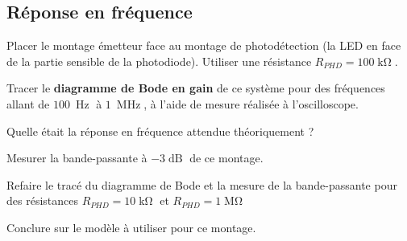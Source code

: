 \subsection{Réponse en fréquence}

\Manip Placer le montage émetteur face au montage de photodétection (la LED en face de la partie sensible de la photodiode). Utiliser une résistance $R_{PHD} = 100\operatorname{k\Omega}$.

\Manip Tracer le \textbf{diagramme de Bode en gain} de ce système pour des fréquences allant de $100~\operatorname{Hz}$ à $1~\operatorname{MHz}$, à l'aide de mesure réalisée à l'oscilloscope.

\Quest Quelle était la réponse en fréquence attendue théoriquement ? 

\Manip Mesurer la bande-passante à $-3\operatorname{dB}$ de ce montage.

\medskip

\Manip Refaire le tracé du diagramme de Bode et la mesure de la bande-passante pour des résistances $R_{PHD} = 10\operatorname{k\Omega}$ et $R_{PHD} = 1\operatorname{M\Omega}$

\Quest Conclure sur le modèle à utiliser pour ce montage. 




